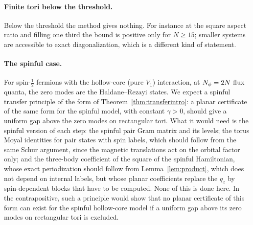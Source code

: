 \paragraph{Finite tori below the threshold.} Below the threshold the method gives nothing. For instance at the square aspect ratio
and filling one third the bound is positive only for $N\ge15$; smaller systems are accessible to exact diagonalization, which is a
different kind of statement.

\paragraph{The spinful case.} For spin-$\frac12$ fermions with the hollow-core (pure $V_1$) interaction, at $N_{\phi}=2N$ flux quanta,
the zero modes are the Haldane--Rezayi states. We expect a spinful transfer principle of the form of Theorem~\ref{thm:transferintro}: a
planar certificate of the same form for the spinful model, with constant $\gamma>0$, should give a uniform gap above the zero
modes on rectangular tori. What it would need is the spinful version of each step: the spinful pair Gram matrix and its levels; the torus Moyal
identities for pair states with spin labels, which should follow from the same Schur argument, since the magnetic translations
act on the orbital factor only; and the three-body coefficient of the square of the spinful Hamiltonian, whose exact
periodization should follow from Lemma~\ref{lem:product}, which does not depend on internal labels, but whose planar coefficients
replace the $q_z$ by spin-dependent blocks that have to be computed. None of this is done here. In the contrapositive, such a
principle would show that no planar certificate of this form can exist for the spinful hollow-core model if a uniform gap above
its zero modes on rectangular tori is excluded.
